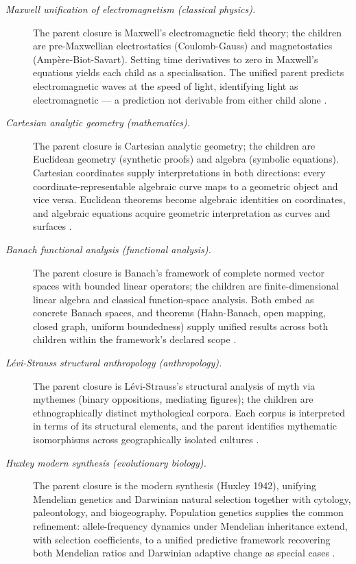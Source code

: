 \documentclass[11pt]{article}
\theoremstyle{definition}
\begin{document}
\begin{description}
\item[\emph{Maxwell unification of electromagnetism
(classical physics).}]
The parent closure is Maxwell's electromagnetic
field theory; the children are pre-Maxwellian
electrostatics (Coulomb-Gauss) and magnetostatics
(Amp\`ere-Biot-Savart).  Setting time derivatives to
zero in Maxwell's equations yields each child as a
specialisation.  The unified parent predicts
electromagnetic waves at the speed of light,
identifying light as electromagnetic — a
prediction not derivable from either child alone
\citep{Maxwell1865Dynamical}.

\item[\emph{Cartesian analytic geometry
(mathematics).}]
The parent closure is Cartesian analytic geometry;
the children are Euclidean geometry (synthetic
proofs) and algebra (symbolic equations).  Cartesian
coordinates supply interpretations in both
directions: every coordinate-representable
algebraic curve maps to a geometric object and
vice versa.  Euclidean theorems become algebraic
identities on coordinates, and algebraic equations
acquire geometric interpretation as curves and
surfaces \citep{Descartes1637Geometrie}.

\item[\emph{Banach functional analysis (functional
analysis).}]
The parent closure is Banach's framework of complete
normed vector spaces with bounded linear operators;
the children are finite-dimensional linear algebra
and classical function-space analysis.  Both embed
as concrete Banach spaces, and theorems
(Hahn-Banach, open mapping, closed graph, uniform
boundedness) supply unified results across both
children within the framework's declared scope
\citep{Banach1932Theorie}.

\item[\emph{L\'evi-Strauss structural anthropology
(anthropology).}]
The parent closure is L\'evi-Strauss's structural
analysis of myth via mythemes (binary oppositions,
mediating figures); the children are
ethnographically distinct mythological corpora.
Each corpus is interpreted in terms of its
structural elements, and the parent identifies
mythematic isomorphisms across geographically
isolated cultures \citep{LeviStrauss1958Anthropologie}.

\item[\emph{Huxley modern synthesis (evolutionary
biology).}]
The parent closure is the modern synthesis (Huxley
1942), unifying Mendelian genetics and Darwinian
natural selection together with cytology,
paleontology, and biogeography.  Population
genetics supplies the common refinement:
allele-frequency dynamics under Mendelian
inheritance extend, with selection coefficients, to a
unified
predictive framework recovering both Mendelian
ratios and Darwinian adaptive change as special
cases \citep{Huxley1942Evolution}.
\end{description}
\end{document}
